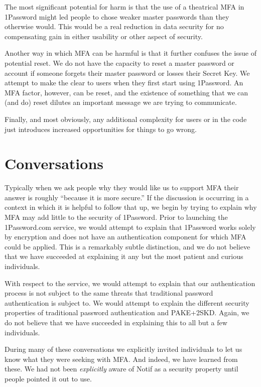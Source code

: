 \documentclass{soups}
\begin{document}
The most significant potential for harm is that the use of a theatrical MFA in 1Password might led people to chose weaker master passwords than they otherwise would. This would be a real reduction in data security for no compensating gain in either usability or other aspect of security.

Another way in which MFA can be harmful is that it further confuses the issue of potential reset. We do not have the capacity to reset a master password or account if someone forgets their master password or losses their Secret Key. We attempt to make the clear to users when they first start using 1Password. An MFA factor, however, can be reset, and the existence of something that we can (and do) reset dilutes an important message we are trying to communicate.

Finally, and most obviously, any additional complexity for users or in the code just introduces increased opportunities for things to go wrong.

\section{Conversations}

Typically
when we ask people why they would like us to support MFA their answer is roughly “because it is more secure.” 
If the discussion is occurring in a context in which it is helpful to follow that up,
we begin by trying to explain why MFA may add little to the security of 1Password.
Prior to launching the 1Password.com service, we would attempt to explain that
1Password works solely by encryption and does not have an authentication component for which MFA could be applied.
This is a remarkably subtle distinction,
and we do not believe that we have succeeded at explaining it any but the
most patient and curious individuals.

With respect to the service, we would attempt to explain that our authentication process is not subject to the same threats that traditional password authentication is subject to.
We would attempt to explain the different security properties of traditional password authentication and PAKE+2SKD.
Again, we do not believe that we have succeeded in explaining this to all but
a few individuals.

During many of these conversations we explicitly invited individuals to let
us know what they were seeking with MFA.
And indeed, we have learned from these.
We had not been \emph{explicitly} aware of Notif as a security property
until people pointed it out to use.
\end{document}
